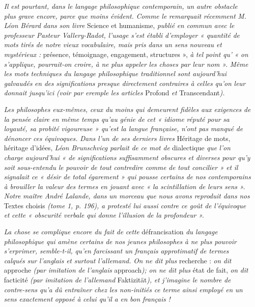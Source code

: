 {\it Il est pourtant, dans le langage philosophique contemporain, un autre
obstacle plus grave encore, parce que moins évident. Comme le remarquait
récemment M. Léon Bérard dans son livre} Science et humanisme, {\it publié
en commun avec le professeur Pasteur Vallery-Radot, l'usage s’est établi
d'employer « quantité de mots tirés de notre vieux vocabulaire, mais pris
dans un sens nouveau et mystérieux :} présence, témoignage, engagement,
structures », {\it à tel point qu’ « on s'applique, pourrait-on croire, à ne plus
appeler les choses par leur nom ». Même les mots techniques du langage philosophique
traditionnel sont aujourd'hui galvaudés en des significations presque
directement contraires à celles qu'on leur donnait jusqu'ici (voir par eremple
les articles} Profond {\it et} Transcendant{\it ).}

{\it Les philosophes eux-mêmes, ceux du moins qui demeurent fidèles aux
exigences de la pensée claire en même temps qu'au génie de cet « idiome réputé
pour sa loyauté, sa probité vigoureuse » qu’est la langue française, n’ont pas
manqué de dénoncer ces équivoques. Dans l’un de ses derniers livres} Héritage
de mots, héritage d'idées, {\it Léon Brunschvicg parlait de ce mot de} dialectique
{\it que l’on charge aujourd’hui « de significations suffisamment obscures et
diverses pour qu'y soit sous-entendu le pouvoir de tout contredire comme de
tout concilier » et il signalait ce « désir de total égarement » qui pousse certains
de nos contemporains à brouiller la valeur des termes en jouant avec « la scintillation
de leurs sens ». Notre maître André Lalande, dans un morceau que
nous avons reproduit dans nos} Textes choisis {\it (tome 1, p. 196), a protesté
lui aussi contre ce goût de l’équivoque et cette « obscurité verbale qui donne
l'illusion de la profondeur ».}

{\it La chose se complique encore du fait de cette} défrancisation {\it du langage
philosophique qui amène certains de nos jeunes philosophes à ne plus pouvoir
s’erprimer, semble-t-il, qu’en farcissant un français approtimatif de termes
calqués sur l'anglais et surtout l'allemand. On ne dit plus} recherche : {\it on dit}
approche {\it (par imitation de l'anglais} approach{\it ); on ne dit plus} état de fait,
{\it on dit} facticité {\it (par imitation de l'allemand} Faktizität{\it ), et j'imagine le
nombre de contre-sens qu'a dû entraîner chez les non-initiés ce terme ainsi
employé en un sens exactement opposé à celui qu’il a en bon français !}


